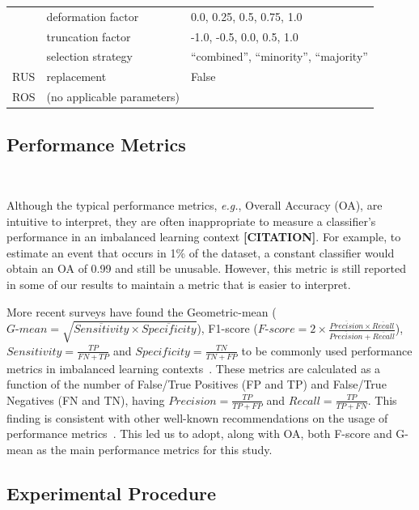 \documentclass[parskip=full]{scrartcl}
\begin{document}
\begin{table}
\begin{tabular}{lll}
                        & deformation factor               & 0.0, 0.25, 0.5, 0.75, 1.0      \\
                        & truncation factor                & -1.0, -0.5, 0.0, 0.5, 1.0      \\
                        & selection strategy               & ``combined'',
                        ``minority'', ``majority''\\
		RUS             & replacement                      & False                          \\
		ROS             & (no applicable parameters)       &                                \\
		\bottomrule
	\end{tabular}
\end{table}

\subsection{Performance Metrics}~\label{sec:performance_metrics}

Although the typical performance metrics, \textit{e.g.}, Overall Accuracy
(OA), are intuitive to interpret, they are often inappropriate to measure a
classifier's performance in an imbalanced learning context
\textbf{[CITATION]}. For example, to estimate an event that occurs in 1\% of
the dataset, a constant classifier would obtain an OA of 0.99 and still be
unusable. However, this metric is still reported in some of our results to
maintain a metric that is easier to interpret.

More recent surveys have found the Geometric-mean ($\textit{G-mean} =
\sqrt{\overline{Sensitivity} \times \overline{Specificity}}$), F1-score
($\textit{F-score}=2\times\frac{\overline{Precision} \times
\overline{Recall}}{\overline{Precision} + \overline{Recall}}$), $Sensitivity =
\frac{TP}{FN+TP}$ and $Specificity = \frac{TN}{TN + FP}$ to be commonly used
performance metrics in imbalanced learning contexts~\cite{rout2018handling}.
These metrics are calculated as a function of the number of False/True
Positives (FP and TP) and False/True Negatives (FN and TN), having
$Precision = \frac{TP}{TP+FP}$ and $Recall = \frac{TP}{TP+FN}$.
This finding is consistent with other well-known recommendations on the usage
of performance metrics~\cite{jeni2013facing}. This led us to adopt, along with
OA, both F-score and G-mean as the main performance metrics for this study. 

\subsection{Experimental Procedure}~\label{sec:experimental_procedure}
\end{document}
